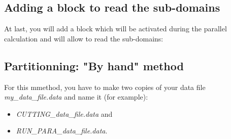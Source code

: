 \subsection{Adding a block to read the sub-domains}
At last, you will add a block which will be activated during the parallel calculation and will allow to read the sub-domains:
\begin{center}
\end{center}


\subsection{Partitionning: "By hand" method}
For this mmethod, you have to make two copies of your data file \textit{my\_data\_file.data} and name it (for example):
\begin{itemize}
\item \textit{CUTTING\_data\_file.data} and 
\item \textit{RUN\_PARA\_data\_file.data}.
\end{itemize}


